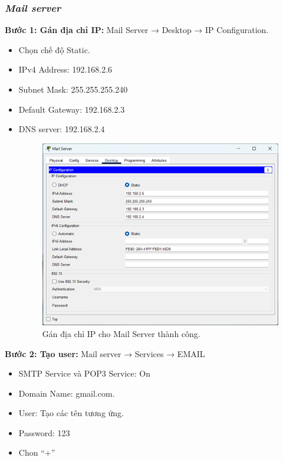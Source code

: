 \documentclass[12pt, a4paper]{article}
\begin{document}
	\newpage
	\subsubsection{\textit{Mail server}}
	\begin{flushleft}
		\textbf{Bước 1: Gán địa chỉ IP:} Mail Server → Desktop → IP Configuration.
		\begin{itemize}[leftmargin=0.75cm]
			\item Chọn chế độ Static.
			\item IPv4 Address: 192.168.2.6
			\item Subnet Mask: 255.255.255.240
			\item Default Gateway: 192.168.2.3
			\item DNS server: 192.168.2.4
			\begin{figure}[H]
				\centering
				\includegraphics[width=1\textwidth]{mail_ip.png}
				\caption{Gán địa chỉ IP cho Mail Server thành công.}
			\end{figure}
		\end{itemize}
		\newpage
		\textbf{Bước 2: Tạo user:} Mail server → Services → EMAIL 
		\begin{itemize}[leftmargin=0.75cm]
			\item SMTP Service và POP3 Service: On
			\item Domain Name: gmail.com. 
			\item User: Tạo các tên tương ứng.
			\item Password: 123
			\item Chon “+”
			\begin{figure}[H]

\end{figure}
\end{itemize}
\end{flushleft}
\end{document}
